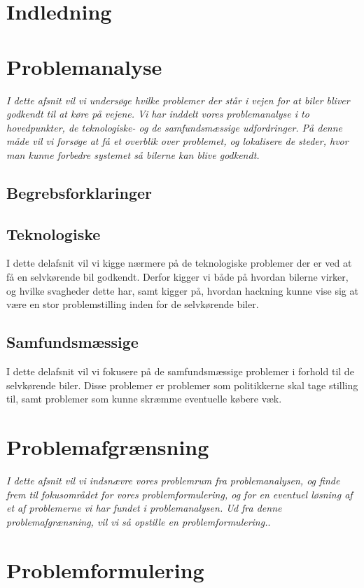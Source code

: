 \documentclass[12pt,hidelinks]{article}
\begin{document}
    \sloppy
    \titleGM
	\newpage
	\tableofcontents
	\newpage
	\section{Indledning}
	
	\section{Problemanalyse}
	\textit{I dette afsnit vil vi undersøge hvilke problemer der står i vejen for at biler bliver godkendt til at køre på vejene. Vi har inddelt vores problemanalyse i to hovedpunkter, de teknologiske- og de samfundsmæssige udfordringer. På denne måde vil vi forsøge at få et overblik over problemet, og lokalisere de steder, hvor man kunne forbedre systemet så bilerne kan blive godkendt.}
	\subsection{Begrebsforklaringer}
	
	\subsection{Teknologiske}
	I dette delafsnit vil vi kigge nærmere på de teknologiske problemer der er ved at få en selvkørende bil godkendt. Derfor kigger vi både på hvordan bilerne virker, og hvilke svagheder dette har, samt kigger på, hvordan hackning kunne vise sig at være en stor problemstilling inden for de selvkørende biler.
	
	
	
    
	\subsection{Samfundsmæssige}
	I dette delafsnit vil vi fokusere på de samfundsmæssige problemer i forhold til de selvkørende biler. Disse problemer er problemer som politikkerne skal tage stilling til, samt problemer som kunne skræmme eventuelle købere væk.
	
	
	\section{Problemafgrænsning}
	\textit{I dette afsnit vil vi indsnævre vores problemrum fra problemanalysen, og finde frem til fokusområdet for vores problemformulering, og for en eventuel løsning af et af problemerne vi har fundet i problemanalysen. Ud fra denne problemafgrænsning, vil vi så opstille en problemformulering.}.
    	
    \section{Problemformulering}
	
	
\end{document}
